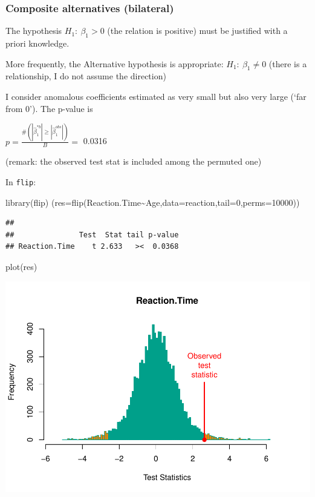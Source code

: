 \documentclass[
]{article}
\newenvironment{Shaded}{\begin{snugshade}}{\end{snugshade}}
\newcommand{\AttributeTok}[1]{\textcolor[rgb]{0.77,0.63,0.00}{#1}}
\newcommand{\DecValTok}[1]{\textcolor[rgb]{0.00,0.00,0.81}{#1}}
\newcommand{\FunctionTok}[1]{\textcolor[rgb]{0.00,0.00,0.00}{#1}}
\newcommand{\NormalTok}[1]{#1}
\newcommand{\SpecialCharTok}[1]{\textcolor[rgb]{0.00,0.00,0.00}{#1}}
\begin{document}
\hypertarget{composite-alternatives-bilateral}{%
\subsubsection{Composite alternatives
(bilateral)}\label{composite-alternatives-bilateral}}

The hypothesis \(H_1: \ \beta_1 >0\) (the relation is positive) must be
justified with a priori knowledge.

More frequently, the Alternative hypothesis is appropriate:
\(H_1: \ \beta_1 \neq 0\) (there is a relationship, I do not assume the
direction)

I consider anomalous coefficients estimated as very small but also very
large (`far from 0'). The p-value is

\(p=\frac{\#(|\hat{\beta}_1^{*b} | \geq|\hat{\beta}_1^{obs}|)}{B}=\)
0.0316

(remark: the observed test stat is included among the permuted one)

In \texttt{flip}:

\begin{Shaded}
\begin{Highlighting}[]
\FunctionTok{library}\NormalTok{(flip)}
\NormalTok{(}\AttributeTok{res=}\FunctionTok{flip}\NormalTok{(Reaction.Time}\SpecialCharTok{\textasciitilde{}}\NormalTok{Age,}\AttributeTok{data=}\NormalTok{reaction,}\AttributeTok{tail=}\DecValTok{0}\NormalTok{,}\AttributeTok{perms=}\DecValTok{10000}\NormalTok{))}
\end{Highlighting}
\end{Shaded}

\begin{verbatim}
## 
##               Test  Stat tail p-value
## Reaction.Time    t 2.633   ><  0.0368
\end{verbatim}

\begin{Shaded}
\begin{Highlighting}[]
\FunctionTok{plot}\NormalTok{(res)}
\end{Highlighting}
\end{Shaded}

\begin{center}\includegraphics{perm_files/figure-latex/unnamed-chunk-16-1} \end{center}
\end{document}

